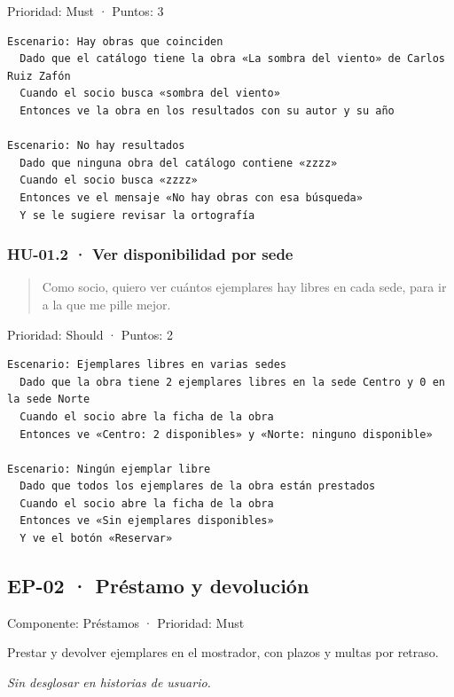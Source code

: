 \documentclass[11pt,a4paper]{article}
\begin{document}
Prioridad: Must · Puntos: 3

\begin{Verbatim}[breaklines,fontsize=\small,frame=single,framerule=0.4pt,rulecolor=\color{black!25}]
Escenario: Hay obras que coinciden
  Dado que el catálogo tiene la obra «La sombra del viento» de Carlos Ruiz Zafón
  Cuando el socio busca «sombra del viento»
  Entonces ve la obra en los resultados con su autor y su año

Escenario: No hay resultados
  Dado que ninguna obra del catálogo contiene «zzzz»
  Cuando el socio busca «zzzz»
  Entonces ve el mensaje «No hay obras con esa búsqueda»
  Y se le sugiere revisar la ortografía
\end{Verbatim}

\subsubsection*{HU-01.2 · Ver disponibilidad por sede}

\begin{quote}
Como socio, quiero ver cuántos ejemplares hay libres en cada sede, para ir a la que me pille mejor.
\end{quote}

Prioridad: Should · Puntos: 2

\begin{Verbatim}[breaklines,fontsize=\small,frame=single,framerule=0.4pt,rulecolor=\color{black!25}]
Escenario: Ejemplares libres en varias sedes
  Dado que la obra tiene 2 ejemplares libres en la sede Centro y 0 en la sede Norte
  Cuando el socio abre la ficha de la obra
  Entonces ve «Centro: 2 disponibles» y «Norte: ninguno disponible»

Escenario: Ningún ejemplar libre
  Dado que todos los ejemplares de la obra están prestados
  Cuando el socio abre la ficha de la obra
  Entonces ve «Sin ejemplares disponibles»
  Y ve el botón «Reservar»
\end{Verbatim}

\subsection*{EP-02 · Préstamo y devolución}

Componente: Préstamos · Prioridad: Must

Prestar y devolver ejemplares en el mostrador, con plazos y multas por retraso.

\emph{Sin desglosar en historias de usuario.}
\end{document}
